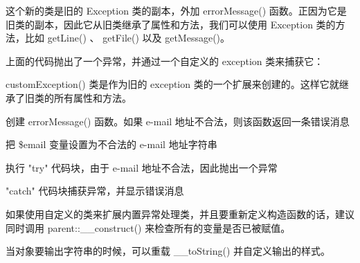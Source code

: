 这个新的类是旧的 Exception 类的副本，外加 errorMessage() 函数。正因为它是旧类的副本，因此它从旧类继承了属性和方法，我们可以使用 Exception 类的方法，比如 getLine() 、 getFile() 以及 getMessage()。

上面的代码抛出了一个异常，并通过一个自定义的 exception 类来捕获它：

\begin{compactenum}
\item customException() 类是作为旧的 exception 类的一个扩展来创建的。这样它就继承了旧类的所有属性和方法。
\item 创建 errorMessage() 函数。如果 e-mail 地址不合法，则该函数返回一条错误消息
\item 把 \$email 变量设置为不合法的 e-mail 地址字符串
\item 执行 "try" 代码块，由于 e-mail 地址不合法，因此抛出一个异常
\item "catch" 代码块捕获异常，并显示错误消息
\end{compactenum}

如果使用自定义的类来扩展内置异常处理类，并且要重新定义构造函数的话，建议同时调用 parent::\_\_construct() 来检查所有的变量是否已被赋值。

当对象要输出字符串的时候，可以重载 \_\_toString() 并自定义输出的样式。

